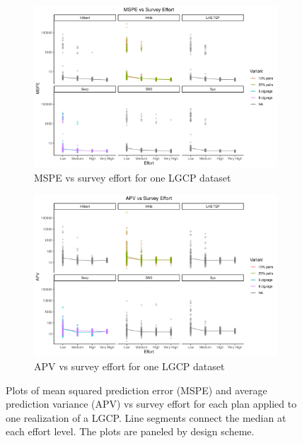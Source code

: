 \documentclass[review]{elsarticle}
\begin{document}
\begin{figure}

\begin{subfigure}{5in}
\includegraphics[width=5in]{../graphics/MSPE-effort-LGCP000004.png}
\caption{MSPE vs survey effort for one LGCP dataset}
\label{mspelgcp}
\end{subfigure}

\begin{subfigure}{5in}
\includegraphics[width=5in]{../graphics/APV-effort-LGCP000004.png}
\caption{APV vs survey effort for one LGCP dataset}
\label{apvlgcp}
\end{subfigure}

\caption{Plots of mean squared prediction error (MSPE) and average prediction
variance (APV) vs survey effort for each plan applied to one realization of a
LGCP. Line segments connect the median at each effort level. The plots are
paneled by design scheme.}
\label{lgcpresults}
\end{figure}
\end{document}
